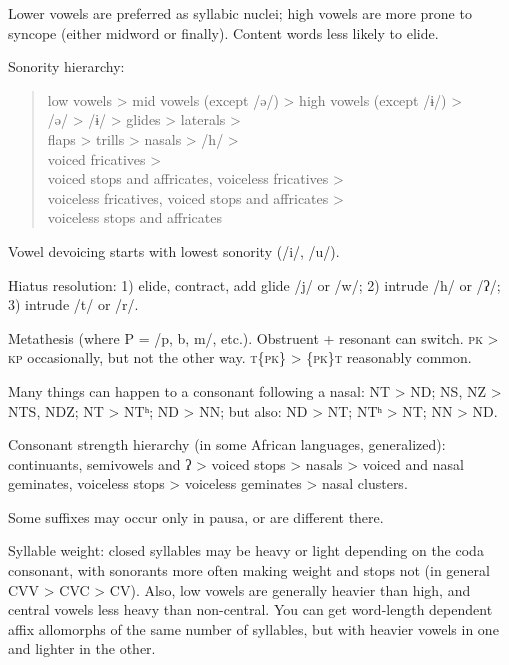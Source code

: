 \documentclass[11pt]{article}
\newcommand{\I}[1]{\textsc{#1}}   %
\begin{document}
Lower vowels are preferred as syllabic nuclei; high vowels are more
prone to syncope (either midword or finally).  Content words less
likely to elide.

Sonority hierarchy:
\begin{quotation}
\noindent low vowels > mid vowels (except /ə/) > high vowels (except /ɨ/) > \\
\indent /ə/ > /ɨ/ > glides > laterals > \\
\indent flaps > trills > nasals > /h/ > \\
\indent voiced fricatives > \\
\indent voiced stops and affricates, voiceless fricatives > \\
\indent voiceless fricatives, voiced stops and affricates > \\
\indent voiceless stops and affricates
\end{quotation}

Vowel devoicing starts with lowest sonority  (/i/, /u/).

Hiatus resolution: 1) elide, contract, add glide /j/ or /w/; 2)
intrude /h/ or /ʔ/; 3) intrude /t/ or /r/.

Metathesis (where P = /p, b, m/, etc.).  Obstruent + resonant can
switch.  \I{pk} > \I{kp} occasionally, but not the other way.
\I{t\{pk\}} > \I{\{pk\}t} reasonably common.

Many things can happen to a consonant following a nasal: NT > ND; NS,
NZ > NTS, NDZ; NT > NTʰ; ND > NN; but also: ND > NT; NTʰ > NT; NN >
ND.

Consonant strength hierarchy (in some African languages, generalized):
continuants, semivowels and ʔ > voiced stops > nasals > voiced and
nasal geminates, voiceless stops > voiceless geminates > nasal
clusters.

Some suffixes may occur only in pausa, or are different there.

Syllable weight: closed syllables may be heavy or light depending on
the coda consonant, with sonorants more often making weight and stops
not (in general CVV > CVC > CV).  Also, low vowels are generally
heavier than high, and central vowels less heavy than non-central. You
can get word-length dependent affix allomorphs of the same number of
syllables, but with heavier vowels in one and lighter in the other.
\end{document}
